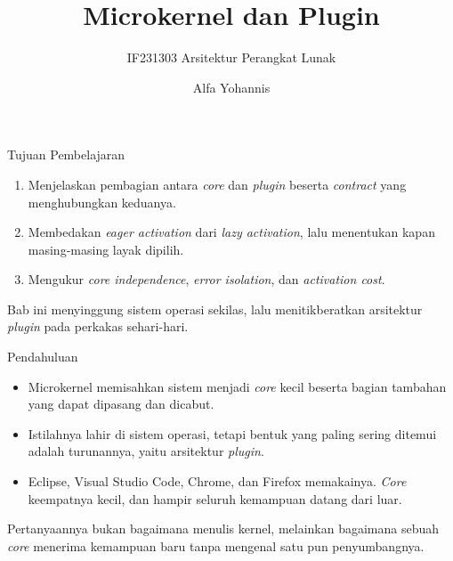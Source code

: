 \documentclass[aspectratio=169, table, 12pt]{beamer}
\title{\Huge{Microkernel dan Plugin}}
\subtitle{IF231303 Arsitektur Perangkat Lunak}
\author{Alfa Yohannis}
\begin{document}
\frame{\titlepage}

\begin{frame}{{\Large Tujuan Pembelajaran}}
  \vspace{10pt}
  \begin{enumerate}
    \item Menjelaskan pembagian antara \textit{core} dan \textit{plugin} beserta \textit{contract}
          yang menghubungkan keduanya.
    \item Membedakan \textit{eager activation} dari \textit{lazy activation}, lalu menentukan kapan
          masing-masing layak dipilih.
    \item Mengukur \textit{core independence}, \textit{error isolation}, dan
          \textit{activation cost}.
  \end{enumerate}

  \vspace{10pt}
  {\small Bab ini menyinggung sistem operasi sekilas, lalu menitikberatkan
  arsitektur \textit{plugin} pada perkakas sehari-hari.}
\end{frame}

\begin{frame}{{\Large Pendahuluan}}
  \vspace{8pt}
  \begin{itemize}\small
    \item Microkernel memisahkan sistem menjadi \textit{core} kecil beserta bagian
          tambahan yang dapat dipasang dan dicabut.
    \item Istilahnya lahir di sistem operasi, tetapi bentuk yang paling sering
          ditemui adalah turunannya, yaitu arsitektur \textit{plugin}.
    \item Eclipse, Visual Studio Code, Chrome, dan Firefox memakainya. \textit{Core}
          keempatnya kecil, dan hampir seluruh kemampuan datang dari luar.
  \end{itemize}

  \vspace{8pt}
  {\small Pertanyaannya bukan bagaimana menulis kernel, melainkan bagaimana
  sebuah \textit{core} menerima kemampuan baru tanpa mengenal satu pun penyumbangnya.}
\end{frame}
\end{document}
